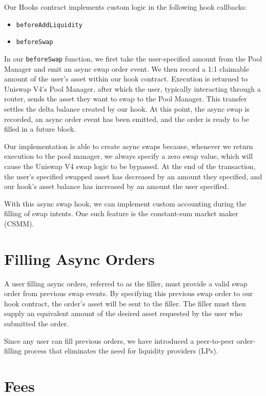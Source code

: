 \documentclass[bibliography=numbered]{article}
\begin{document}
Our Hooks contract implements custom logic in the following hook callbacks:

\begin{itemize}
\item \texttt{beforeAddLiquidity}
\item \texttt{beforeSwap}
\end{itemize}

In our \texttt{beforeSwap} function, we first take the user-specified amount from the Pool Manager and emit an async swap order event. We then record a 1:1 claimable amount of the user's asset within our hook contract. Execution is returned to Uniswap V4’s Pool Manager, after which the user, typically interacting through a router, sends the asset they want to swap to the Pool Manager. This transfer settles the delta balance created by our hook. At this point, the async swap is recorded, an async order event has been emitted, and the order is ready to be filled in a future block.

Our implementation is able to create async swaps because, whenever we return execution to the pool manager, we always specify a zero swap value, which will cause the Uniswap V4 swap logic to be bypassed. At the end of the transaction, the user's specified swapped asset has decreased by an amount they specified, and our hook's asset balance has increased by an amount the user specified.

With this async swap hook, we can implement custom accounting during the filling of swap intents. One such feature is the constant-sum market maker (CSMM).

\section{Filling Async Orders}

A user filling async orders, referred to as the filler, must provide a valid swap order from previous swap events. By specifying this previous swap order to our hook contract, the order's asset will be sent to the filler. The filler must then supply an equivalent amount of the desired asset requested by the user who submitted the order.

Since any user can fill previous orders, we have introduced a peer-to-peer order-filling process that eliminates the need for liquidity providers (LPs).

\section{Fees}
\end{document}
